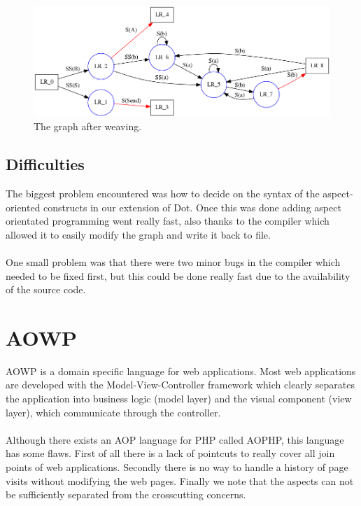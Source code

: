 \documentclass[a4paper]{report}
\begin{document}
\begin{figure}
\includegraphics[width=\textwidth]{images/AOFDot/ExampleAfter.png}
\caption{The graph after weaving.}
\end{figure}

\section{Difficulties}
The biggest problem encountered was how to decide on the syntax of the aspect-oriented constructs in our extension of Dot. Once this was done adding aspect orientated programming went really fast, also thanks to the compiler which allowed it to easily modify the graph and write it back to file.\\
\\
One small problem was that there were two minor bugs in the compiler which needed to be fixed first, but this could be done really fast due to the availability of the source code.

\chapter{AOWP}
AOWP \cite{hokamura_aspect-oriented_2008} is a domain specific language for web applications. Most web applications are developed with the Model-View-Controller framework which clearly separates the application into business logic (model layer) and the visual component (view layer), which communicate through the controller.\\
\\
Although there exists an AOP language for PHP called AOPHP, this language has some flaws. First of all there is a lack of pointcuts to really cover all join points of web applications. Secondly there is no way to handle a history of page visits without modifying the web pages. Finally we note that the aspects can not be sufficiently separated from the crosscutting concerns.
\end{document}
